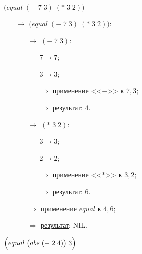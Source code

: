 \problem $\bigl(equal\; (-\; 7\; 3)\; (*\; 3\; 2) \bigr)$

\begin{itemize}
	\item[$\longrightarrow$] $\bigl(equal\; (-\; 7\; 3)\; (*\; 3\; 2) \bigr)$:
	\begin{itemize}
		\item[$\longrightarrow$] $(-\; 7\; 3)$:
		\begin{itemize}
			\item[\textbullet] $7 \to 7$;
			\item[\textbullet] $3 \to 3$;
			\item[$\Longrightarrow$] применение <<$-$>> к $7, 3$;
			\item[$\Longrightarrow$] \underline{результат}: $4$.
		\end{itemize}
		\item[$\longrightarrow$] $(*\; 3\; 2)$:
		\begin{itemize}
			\item[\textbullet] $3 \to 3$;
			\item[\textbullet] $2 \to 2$;
			\item[$\Longrightarrow$] применение <<$*$>> к $3, 2$;
			\item[$\Longrightarrow$] \underline{результат}: $6$.
		\end{itemize}
		\item[$\Longrightarrow$] применение $equal$ к $4, 6$;
		\item[$\Longrightarrow$] \underline{результат}: NIL.
	\end{itemize}
\end{itemize}


\problem $\Bigl(equal\; \bigl(abs\; (-\; 2\; 4)\bigr)\; 3\Bigr)$

